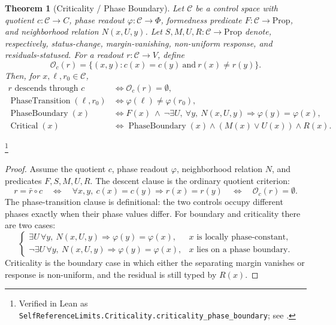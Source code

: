 \documentclass[11pt]{article}
\newtheorem{theorem}{Theorem}[section]
\theoremstyle{definition}
\begin{document}
\begin{theorem}[Criticality / Phase Boundary]\label{thm:F44}
Let \(\mathcal C\) be a control space with quotient
\(c:\mathcal C\to C\), phase readout \(\varphi:\mathcal C\to\Phi\),
formedness predicate \(F:\mathcal C\to\mathrm{Prop}\), and
neighborhood relation \(N(x,U,y)\). Let
\(S,M,U,R:\mathcal C\to\mathrm{Prop}\) denote, respectively,
status-change, margin-vanishing, non-uniform response, and
residuals-statused. For a readout \(r:\mathcal C\to V\), define
\[
  \mathcal O_c(r)=
  \{(x,y):c(x)=c(y)\ \text{and}\ r(x)\ne r(y)\}.
\]
Then, for \(x,\ell,r_0\in\mathcal C\),
\begin{align*}
  r \text{ descends through }c
  &\iff \mathcal O_c(r)=\emptyset,\\
  \operatorname{PhaseTransition}(\ell,r_0)
  &\iff \varphi(\ell)\ne\varphi(r_0),\\
  \operatorname{PhaseBoundary}(x)
  &\iff F(x)\ \wedge\
    \neg\exists U,\ \forall y,\ N(x,U,y)\Rightarrow \varphi(y)=\varphi(x),\\
  \operatorname{Critical}(x)
  &\iff \operatorname{PhaseBoundary}(x)\wedge (M(x)\vee U(x))\wedge R(x).
\end{align*}
\end{theorem}
\footnote{\raggedright Verified in Lean as
\texttt{SelfReferenceLimits.\allowbreak{}Criticality.\allowbreak{}criticality\_phase\_boundary};
see \Cref{app:formalization}.}
\begin{proof}
Assume the quotient \(c\), phase readout \(\varphi\), neighborhood
relation \(N\), and predicates \(F,S,M,U,R\). The descent clause is the
ordinary quotient criterion:
\[
  r=\bar r\circ c
  \quad\Longleftrightarrow\quad
  \forall x,y,\ c(x)=c(y)\Rightarrow r(x)=r(y)
  \quad\Longleftrightarrow\quad
  \mathcal O_c(r)=\emptyset .
\]
The phase-transition clause is definitional: the two controls occupy
different phases exactly when their phase values differ. For boundary
and criticality there are two cases:
\[
  \begin{cases}
  \exists U\,\forall y,\ N(x,U,y)\Rightarrow\varphi(y)=\varphi(x),
    &\text{\(x\) is locally phase-constant,}\\
  \neg\exists U\,\forall y,\ N(x,U,y)\Rightarrow\varphi(y)=\varphi(x),
    &\text{\(x\) lies on a phase boundary.}
  \end{cases}
\]
Criticality is the boundary case in which either the separating margin
vanishes or response is non-uniform, and the residual is still typed by
\(R(x)\).
\end{proof}
\end{document}

